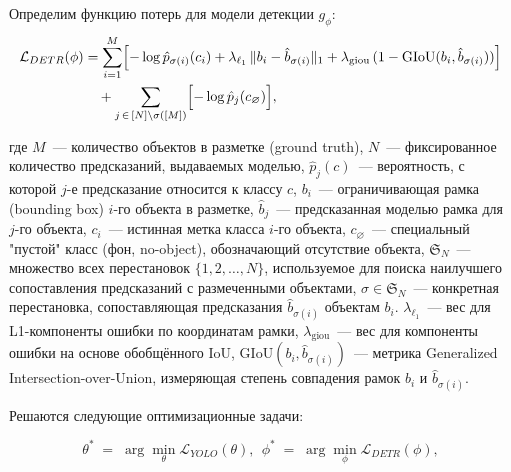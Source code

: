 Определим функцию потерь для модели детекции $g_{\phi}$:
\begin{align*}
\mathcal{L}_{DETR}(\phi)
&=  
   \sum_{i=1}^M \Bigl[
     -\log \hat p_{\sigma(i)}(c_i)
     + \lambda_{\ell_1}\,\|b_i - \hat b_{\sigma(i)}\|_1 
     + \lambda_{\mathrm{giou}}\,(1 - \mathrm{GIoU}(b_i, \hat b_{\sigma(i)}))
   \Bigr] \notag \\
&\quad
+ \sum_{j\,\in\,[N]\setminus\sigma([M])}
  \Bigl[-\log \hat p_j(c_{\varnothing})\Bigr],
\end{align*}

где $M$~--- количество объектов в разметке (ground truth), $N$~--- фиксированное количество предсказаний, выдаваемых моделью, $\hat{p}_j(c)$~--- вероятность, с которой $j$-е предсказание относится к классу $c$, $b_i$~--- ограничивающая рамка (bounding box) $i$-го объекта в разметке,
  $\hat{b}_j$~--- предсказанная моделью рамка для $j$-го объекта,
  $c_i$~--- истинная метка класса $i$-го объекта,
  $c_{\varnothing}$~--- специальный "пустой" класс (фон, no-object), обозначающий отсутствие объекта,
  $\mathfrak{S}_N$~--- множество всех перестановок $\{1, 2, \dots, N\}$, используемое для поиска наилучшего сопоставления предсказаний с размеченными объектами,
  $\sigma \in \mathfrak{S}_N$~--- конкретная перестановка, сопоставляющая предсказания $\hat{b}_{\sigma(i)}$ объектам $b_i$.
  $\lambda_{\ell_1}$~--- вес для L1-компоненты ошибки по координатам рамки,
  $\lambda_{\mathrm{giou}}$~--- вес для компоненты ошибки на основе обобщённого IoU,
  $\mathrm{GIoU}(b_i, \hat{b}_{\sigma(i)})$~--- метрика Generalized Intersection-over-Union, измеряющая степень совпадения рамок $b_i$ и $\hat{b}_{\sigma(i)}$.

  Решаются следующие оптимизационные задачи:

\[
\theta^* \;=\; \arg\min_{\theta} \mathcal{L}_{YOLO}(\theta), \ \ \phi^* \;=\; \arg\min_{\phi} \mathcal{L}_{DETR}(\phi), 
\]







